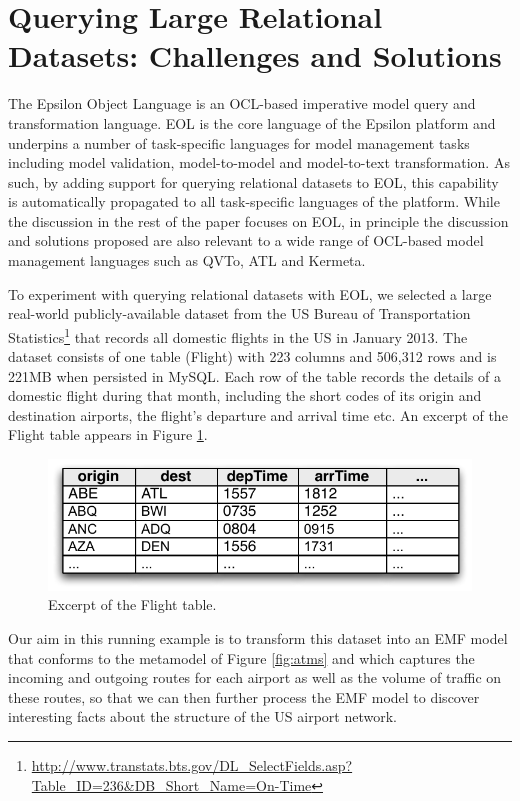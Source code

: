 \section{Querying Large Relational Datasets: Challenges and Solutions}
\label{sec:approach}

The Epsilon Object Language \cite{EOL} is an OCL-based imperative model query and transformation language. EOL is the core language of the Epsilon platform and underpins a number of task-specific languages for model management tasks including model validation, model-to-model and model-to-text transformation. As such, by adding support for querying relational datasets to EOL, this capability is automatically propagated to all task-specific languages of the platform. While the discussion in the rest of the paper focuses on EOL, in principle the discussion and solutions proposed are also relevant to a wide range of OCL-based model management languages such as QVTo, ATL and Kermeta.

To experiment with querying relational datasets with EOL, we selected a large real-world publicly-available dataset from the US Bureau of Transportation Statistics\footnote{\url{http://www.transtats.bts.gov/DL_SelectFields.asp?Table_ID=236&DB_Short_Name=On-Time}} that records all domestic flights in the US in January 2013. The dataset consists of one table (Flight) with 223 columns and 506,312 rows and is 221MB when persisted in MySQL. Each row of the table records the details of a domestic flight during that month, including the short codes of its origin and destination airports, the flight's departure and arrival time etc. An excerpt of the Flight table appears in Figure \ref{fig:database}. 

\begin{figure}[ht]
	\centering
	\includegraphics[width=.8\textwidth]{images/database.pdf}
	\caption{Excerpt of the Flight table.}
	\label{fig:database}
\end{figure}

Our aim in this running example is to transform this dataset into an EMF model that conforms to the metamodel of Figure \ref{fig:atms} and which captures the incoming and outgoing routes for each airport as well as the volume of traffic on these routes, so that we can then further process the EMF model to discover interesting facts about the structure of the US airport network.

